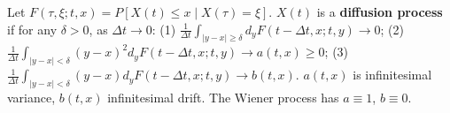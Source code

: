 Let $F(\tau, \xi; t, x) = P[X(t) \leq x \mid X(\tau) = \xi]$. $X(t)$ is a \textbf{diffusion process} if for any $\delta > 0$, as $\Delta t \to 0$:
(1) $\frac{1}{\Delta t} \int_{|y-x| \geq \delta} d_y F(t-\Delta t, x; t, y) \to 0$;
(2) $\frac{1}{\Delta t} \int_{|y-x| < \delta} (y-x)^2 d_y F(t-\Delta t, x; t, y) \to a(t,x) \geq 0$;
(3) $\frac{1}{\Delta t} \int_{|y-x| < \delta} (y-x) d_y F(t-\Delta t, x; t, y) \to b(t,x)$.
$a(t,x)$ is infinitesimal variance, $b(t,x)$ infinitesimal drift. The Wiener process has $a \equiv 1$, $b \equiv 0$.
